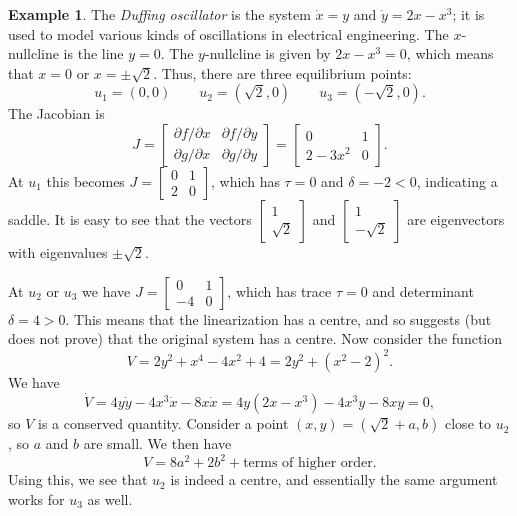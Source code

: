 \documentclass[reqno]{amsart}
\theoremstyle{definition}
\newtheorem{example}[theorem]{Example}
\begin{document}
\begin{example}\label{eg-duffing}
 The \emph{Duffing oscillator} is the system $\dot{x}=y$ and
 $\dot{y}=2x-x^3$; it is used to model various kinds of oscillations
 in electrical engineering.  The $x$-nullcline is the line $y=0$.  The
 $y$-nullcline is given by $2x-x^3=0$, which means that $x=0$ or
 $x=\pm\sqrt{2}$.  Thus, there are three equilibrium points:
 \[ u_1 = (0,0) \qquad u_2 = (\sqrt{2},0) \qquad u_3 = (-\sqrt{2},0). \]
 The Jacobian is 
 \[ J = \left[\begin{array}{cc} \partial f/\partial x & \partial f/\partial y \\
             \partial g/\partial x & \partial g/\partial y \end{array}\right]
      = \left[\begin{array}{cc} 0 & 1 \\
             2-3x^2 & 0 \end{array}\right].
 \]
 At $u_1$ this becomes $J=\left[\begin{array}{cc} 0&1\\2&0\end{array}\right]$, which has $\tau=0$ and
 $\delta=-2<0$, indicating a saddle.  It is easy to see that the vectors
 $\left[\begin{array}{cc} 1\\\sqrt{2}\end{array}\right]$ and $\left[\begin{array}{cc} 1\\-\sqrt{2}\end{array}\right]$ are eigenvectors
 with eigenvalues $\pm\sqrt{2}$.  

 At $u_2$ or $u_3$ we have $J=\left[\begin{array}{cc} 0&1\\-4&0\end{array}\right]$, which has trace
 $\tau=0$ and determinant $\delta=4>0$.  This means that the
 linearization has a centre, and so suggests (but does not prove) that
 the original system has a centre.  Now consider the function 
 \[ V = 2y^2+x^4-4x^2+4 = 2y^2+(x^2-2)^2. \]
 We have
 \[ \dot{V} = 4y\dot{y} - 4x^3\dot{x}-8x\dot{x} 
            = 4y(2x-x^3)-4x^3y-8xy = 0, 
 \]
 so $V$ is a conserved quantity.  Consider a point $(x,y)=(\sqrt{2}+a,b)$
 close to $u_2$, so $a$ and $b$ are small.  We then have
 \[ V = 8a^2 + 2b^2 + \text{terms of higher order}. \]
 Using this, we see that $u_2$ is indeed a centre, and essentially the
 same argument works for $u_3$ as well.


\end{example}
\end{document}
